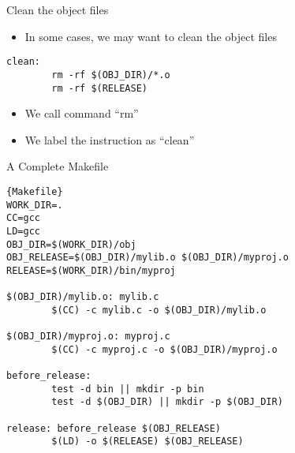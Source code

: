 \begin{frame}[fragile]{Clean the object files}
\lstset{language=[gnu] make}
\begin{itemize}
	\item {In some cases, we may want to clean the object files}
\end{itemize}
\begin{lstlisting}[linewidth=0.9\linewidth, xleftmargin=0.05\linewidth]
clean:
        rm -rf $(OBJ_DIR)/*.o
        rm -rf $(RELEASE)
\end{lstlisting}
\vspace{-0.15in}
\begin{itemize}
	\item {We call command ``rm''}
	\item {We label the instruction as ``clean''}
\end{itemize}

\end{frame}

\begin{frame}[fragile]{A Complete Makefile}
\vspace{-0.1in}
\lstset{language=[gnu] make}
\begin{lstlisting}[linewidth=0.9\linewidth, xleftmargin=0.05\linewidth]{Makefile}
WORK_DIR=.
CC=gcc
LD=gcc
OBJ_DIR=$(WORK_DIR)/obj
OBJ_RELEASE=$(OBJ_DIR)/mylib.o $(OBJ_DIR)/myproj.o
RELEASE=$(WORK_DIR)/bin/myproj

$(OBJ_DIR)/mylib.o: mylib.c
        $(CC) -c mylib.c -o $(OBJ_DIR)/mylib.o

$(OBJ_DIR)/myproj.o: myproj.c
        $(CC) -c myproj.c -o $(OBJ_DIR)/myproj.o

before_release:
        test -d bin || mkdir -p bin
        test -d $(OBJ_DIR) || mkdir -p $(OBJ_DIR)

release: before_release $(OBJ_RELEASE)
        $(LD) -o $(RELEASE) $(OBJ_RELEASE)
\end{lstlisting}

\end{frame}

